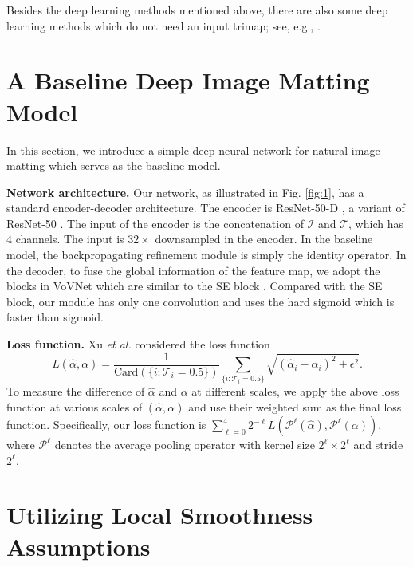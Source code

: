 \documentclass{article}
\theoremstyle{plain}
\begin{document}
Besides the deep learning methods mentioned above, there are also some deep learning methods which do not need an input trimap; see, e.g., \cite{Sengupta2020BackgroundMatting,Qiao2020Attention-GuidedHierarchical}.
 

\section{A Baseline Deep Image Matting Model}
In this section, we introduce a simple deep neural network for natural image matting which serves as the baseline model.




\textbf{Network architecture.}
Our network, as illustrated in Fig. \ref{fig:1},
has a standard encoder-decoder architecture.
The encoder is ResNet-50-D \cite{He2019BagOfTricks}, a variant of ResNet-50 \cite{He2016DeepResidual}.
The input of the encoder is the concatenation of $\mathcal I$ and $\mathcal T$, which has $4$ channels.
The input is $32\times$ downsampled in the encoder.
In the baseline model, the backpropagating refinement module is simply the identity operator.
In the decoder,
to fuse the global information of the feature map,
we adopt the blocks in VoVNet \cite{Lee2019AnEnergy} which are similar to the SE block \cite{Hu2020SqueezeAndExcitation}.
Compared with the SE block, 
our module has only one convolution and uses the hard sigmoid which is faster than sigmoid.




\textbf{Loss function.}
Xu \emph{et al.} \cite{Xu2017DeepImageMatting} considered the loss function
{\small
$$
        L(\hat \alpha, \alpha) =
        \frac{1}{
            \mathrm{Card}
            (\{i: \mathcal T_i = 0.5\})
        }
        \sum_{\{i: \mathcal T_i = 0.5\}}
        \sqrt{(\hat \alpha_i - \alpha_i)^2 + \epsilon^2 }
        .
        $$
}To measure the difference of $\hat \alpha$ and $\alpha$ at different scales, we apply the above loss function at various scales of $(\hat \alpha, \alpha)$ and use their weighted sum as the final loss function.
Specifically, our loss function is
        $\sum_{\ell = 0}^4
        2^{-\ell} 
        L( \mathscr P^\ell(\hat \alpha), \mathscr P^\ell(\alpha) )
        $,
where $\mathscr P^\ell$ denotes the average pooling operator with kernel size $2^\ell \times 2^\ell$ and stride $2^\ell$.






\section{Utilizing Local Smoothness Assumptions}
\end{document}
